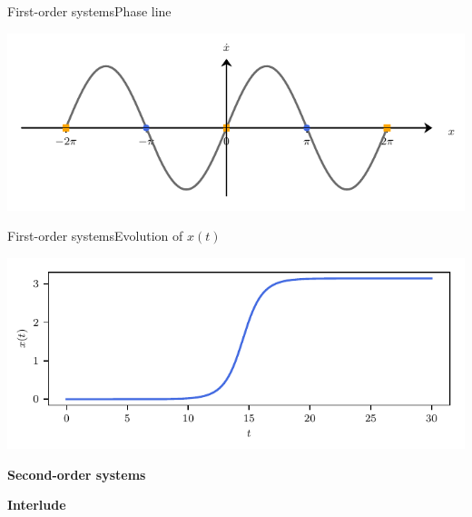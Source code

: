 \documentclass[usenames,dvipsnames,svgnames,10pt,aspectratio=169]{beamer}
\begin{document}
\begin{frame}[t, c]{First-order systems}{Phase line}
	\centering

	\includegraphics[width=.75\textwidth]{flow_on_the_line}

	\vspace{1cm}
\end{frame}

\begin{frame}[t, c]{First-order systems}{Evolution of $x(t)$}
	\centering

		\includegraphics[width=.75\textwidth]{flow_on_the_line_bis}

	\vspace{1cm}
\end{frame}


\begin{frame}[t, c]{}
	\centering
	\vspace{1cm}

	{\Large \textbf{Second-order systems}}

	\bigskip

	{}

\end{frame}

\begin{frame}[t, c]{}{}

\end{frame}

\begin{frame}[t, c]{}
	\centering
	\vspace{1cm}

	{\Large \textbf{Interlude}}

	\bigskip

	{}

\end{frame}
\end{document}
